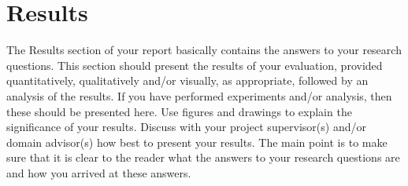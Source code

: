 \section{Results} 

The Results section of your report basically contains the answers to your research questions. This section should present the results of your evaluation, provided quantitatively, qualitatively and/or visually, as appropriate, followed by an analysis of the results. If you have performed experiments and/or analysis, then these should be presented here. Use figures and drawings to explain the significance of your results.
Discuss with your project supervisor(s) and/or domain advisor(s) how best to present your results. The main point is to make sure that it is clear to the reader what the answers to your research questions are and how you arrived at these answers.
